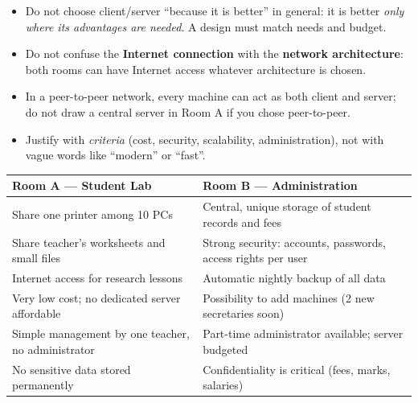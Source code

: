 \documentclass[11pt]{article}
\newcounter{popsec}
\newcounter{popsub}
\newcommand{\courssub}[1]{%
  \stepcounter{popsub}%
  \par\vspace{9pt}\noindent{\popxbold\fontsize{11.5}{13}\selectfont\color{popink}{\color{poporange}\thepopsec.\thepopsub}\hspace{6pt}#1}\par\nopagebreak\vspace{4pt}
}
\begin{document}
\begin{attention}
\begin{itemize}
\item Do not choose client/server ``because it is better'' in general: it is better \emph{only where its advantages are needed}. A design must match needs and budget.
\item Do not confuse the \textbf{Internet connection} with the \textbf{network architecture}: both rooms can have Internet access whatever architecture is chosen.
\item In a peer-to-peer network, every machine can act as both client and server; do not draw a central server in Room A if you chose peer-to-peer.
\item Justify with \emph{criteria} (cost, security, scalability, administration), not with vague words like ``modern'' or ``fast''.
\end{itemize}
\end{attention}

\courssub{Model Answers}

\begin{exemplebox}
\begin{center}
\begin{tabularx}{\linewidth}{|X|X|}
\hline
\rowcolor{popblueL} \textbf{Room A --- Student Lab} & \textbf{Room B --- Administration} \\
\hline
Share one printer among 10 PCs & Central, unique storage of student records and fees \\
\hline
Share teacher's worksheets and small files & Strong security: accounts, passwords, access rights per user \\
\hline
Internet access for research lessons & Automatic nightly backup of all data \\
\hline
Very low cost; no dedicated server affordable & Possibility to add machines (2 new secretaries soon) \\
\hline
Simple management by one teacher, no administrator & Part-time administrator available; server budgeted \\
\hline
No sensitive data stored permanently & Confidentiality is critical (fees, marks, salaries) \\
\hline
\end{tabularx}
\end{center}
\end{exemplebox}
\end{document}
